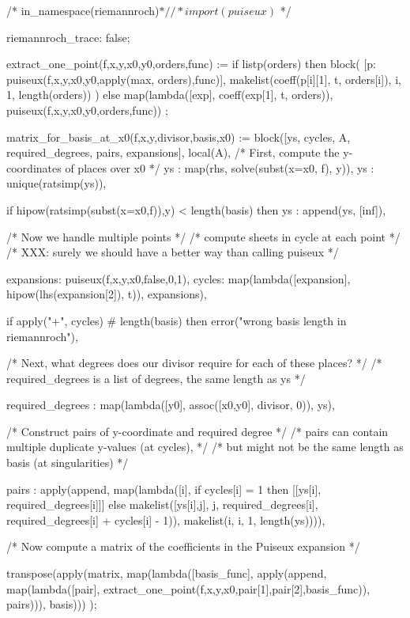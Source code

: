 \begin{maximacommonsmall}
/* in_namespace(riemannroch)$ */
/* import(puiseux)$ */

riemannroch_trace: false;

extract_one_point(f,x,y,x0,y0,orders,func) :=
  if listp(orders) then block(
    [p: puiseux(f,x,y,x0,y0,apply(max, orders),func)],
    makelist(coeff(p[i][1], t, orders[i]), i, 1, length(orders))
  )
  else
    map(lambda([exp], coeff(exp[1], t, orders)), puiseux(f,x,y,x0,y0,orders,func))
;

matrix_for_basis_at_x0(f,x,y,divisor,basis,x0) :=
 block([ys, cycles, A, required_degrees, pairs, expansions], local(A),
    /* First, compute the y-coordinates of places over x0 */
    ys : map(rhs, solve(subst(x=x0, f), y)),
    ys : unique(ratsimp(ys)),

    if hipow(ratsimp(subst(x=x0,f)),y) < length(basis) then
      ys : append(ys, [inf]),

    /* Now we handle multiple points */
    /* compute sheets in cycle at each point */
    /* XXX: surely we should have a better way than calling puiseux */

    expansions: puiseux(f,x,y,x0,false,0,1),
    cycles: map(lambda([expansion], hipow(lhs(expansion[2]), t)), expansions),

    if apply("+", cycles) # length(basis) then
       error("wrong basis length in riemannroch"),

    /* Next, what degrees does our divisor require for each of these places? */
    /* required_degrees is a list of degrees, the same length as ys */

    required_degrees : map(lambda([y0], assoc([x0,y0], divisor, 0)), ys),

    /* Construct pairs of y-coordinate and required degree */
    /* pairs can contain multiple duplicate y-values (at cycles), */
    /*   but might not be the same length as basis (at singularities) */

    pairs : apply(append, map(lambda([i], if cycles[i] = 1 then [[ys[i], required_degrees[i]]]
                                          else makelist([ys[i],j], j, required_degrees[i], required_degrees[i] + cycles[i] - 1)),
        makelist(i, i, 1, length(ys)))),

    /* Now compute a matrix of the coefficients in the Puiseux expansion */

    transpose(apply(matrix, map(lambda([basis_func],
               apply(append, map(lambda([pair], extract_one_point(f,x,y,x0,pair[1],pair[2],basis_func)),
               pairs))),
        basis)))
);


\end{maximacommonsmall}
